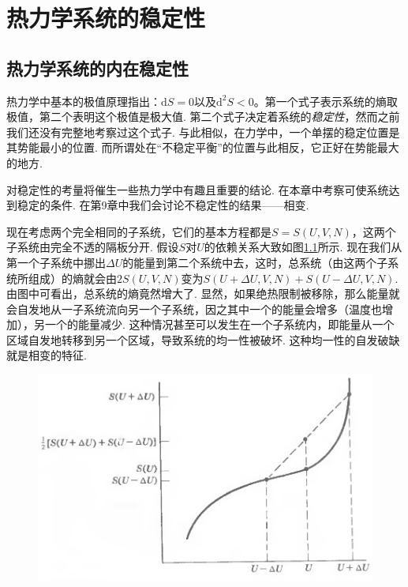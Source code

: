 

\chapter{热力学系统的稳定性}
\label{chap8}
\section{热力学系统的内在稳定性}
\label{sec3.1}
热力学中基本的极值原理指出：$\text{d}S=0$以及$\text{d}^2S<0$。第一个式子表示系统的熵取极值，第二个表明这个极值是极大值. 第二个式子决定着系统的{\it 稳定性}，然而之前我们还没有完整地考察过这个式子. 与此相似，在力学中，一个单摆的稳定位置是其势能最小的位置. 而所谓处在“不稳定平衡”的位置与此相反，它正好在势能最大的地方.

对稳定性的考量将催生一些热力学中有趣且重要的结论. 在本章中考察可使系统达到稳定的条件. 在第9章中我们会讨论不稳定性的结果——相变.

现在考虑两个完全相同的子系统，它们的基本方程都是$S=S(U,V,N)$，这两个子系统由完全不透的隔板分开. 假设$S$对$U$的依赖关系大致如图\ref{fig8.1}所示. 现在我们从第一个子系统中挪出$\Delta U$的能量到第二个系统中去，这时，总系统（由这两个子系统所组成）的熵就会由$2S(U,V,N)$变为$S(U+\Delta　U,V,N)+S(U-\Delta U,V,N)$. 由图中可看出，总系统的熵竟然增大了. 显然，如果绝热限制被移除，那么能量就会自发地从一子系统流向另一个子系统，因之其中一个的能量会增多（温度也增加），另一个的能量减少. 这种情况甚至可以发生在一个子系统内，即能量从一个区域自发地转移到另一个区域，导致系统的均一性被破坏. 这种均一性的自发破缺就是相变的特征.

\begin{figure}
\centering
\includegraphics[width=\textwidth]{Pictures/fig8.1.png}
\label{fig8.1}
\end{figure}

